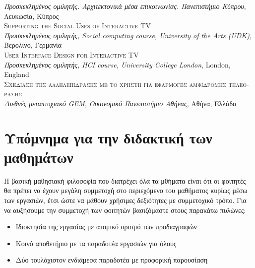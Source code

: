 \documentclass[11pt, a4paper]{article}
\providecommand{\tightlist}{%
  \setlength{\itemsep}{0pt}\setlength{\parskip}{0pt}}
\newcommand{\note}[1]{\marginnote{\scriptsize #1}}
\begin{document}
\begin{greek}
\emph{Προσκεκλημένος ομιλητής. Αρχιτεκτονικά μέσα επικοινωνίας.
Πανεπιστήμιο Κύπρου}, Λευκωσία, Κύπρος\\[.2cm]
\note{2006}\textsc{Supporting the Social Uses of Interactive TV}\\
\emph{Προσκεκλημένος ομιλητής, Social computing course, University of
the Arts (UDK)}, Βερολίνο, Γερμανία\\[.2cm]
\note{2005}\textsc{User Interface Design for Interactive TV}\\
\emph{Προσκεκλημένος ομιλητής, HCI course, University College
London}, London, England\\[.2cm]
\note{2002}\textsc{Σχεδίαση της αλληλεπίδρασης με το χρήστη για
εφαρμογές αμφίδρομης τηλεόρασης}\\
\emph{Διεθνές μεταπτυχιακό GEM, Οικονομικό Πανεπιστήμιο Αθήνας}, Αθήνα,
Ελλάδα\\[.2cm]

\hypertarget{ux3c5ux3c0ux3ccux3bcux3bdux3b7ux3bcux3b1-ux3b3ux3b9ux3b1-ux3c4ux3b7ux3bd-ux3b4ux3b9ux3b4ux3b1ux3baux3c4ux3b9ux3baux3ae-ux3c4ux3c9ux3bd-ux3bcux3b1ux3b8ux3b7ux3bcux3acux3c4ux3c9ux3bd}{%
\section{Υπόμνημα για την διδακτική των
μαθημάτων}\label{ux3c5ux3c0ux3ccux3bcux3bdux3b7ux3bcux3b1-ux3b3ux3b9ux3b1-ux3c4ux3b7ux3bd-ux3b4ux3b9ux3b4ux3b1ux3baux3c4ux3b9ux3baux3ae-ux3c4ux3c9ux3bd-ux3bcux3b1ux3b8ux3b7ux3bcux3acux3c4ux3c9ux3bd}}

Η βασική μαθησιακή φιλοσοφία που διατρέχει όλα τα μθήματα είναι ότι οι
φοιτητές θα πρέπει να έχουν μεγάλη συμμετοχή στο περιεχόμενο του
μαθήματος κυρίως μέσω των εργασιών, έτσι ώστε να μάθουν χρήσιμες
δεξιότητες με συμμετοχικό τρόπο. Για να αυξήσουμε την συμμετοχή των
φοιτητών βασιζόμαστε στους παρακάτω πυλώνες:

\begin{itemize}
\tightlist
\item
  Ιδιοκτησία της εργασίας με ατομικό ορισμό των προδιαγραφών
\item
  Κοινό αποθετήριο με τα παραδοτέα εργασιών για όλους
\item
  Δύο τουλάχιστον ενδιάμεσα παραδοτέα με προφορική παρουσίαση
\end{itemize}


\end{greek}
\end{document}
